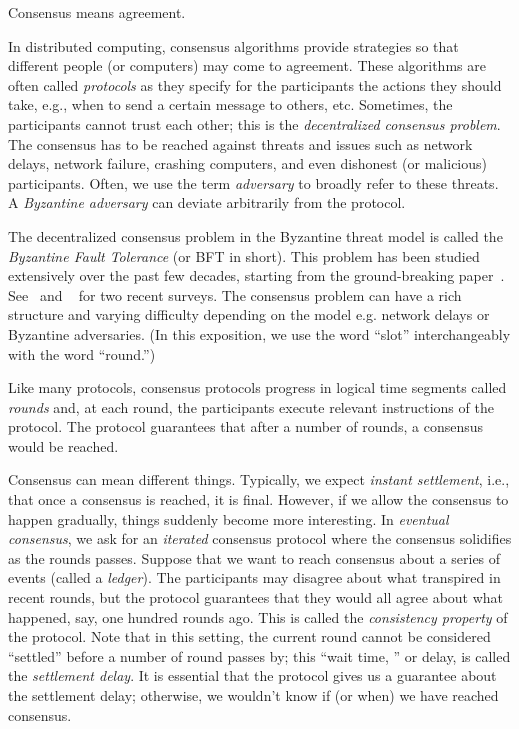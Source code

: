 




Consensus means agreement.

In distributed computing, 
consensus algorithms provide strategies 
so that different people (or computers) 
may come to agreement. 
These algorithms are often called \emph{protocols} as they 
specify for the participants 
the actions they should take, 
e.g., when to send a certain message to others, etc. 
Sometimes, the participants cannot trust each other; 
this is the \emph{decentralized consensus problem}. 
The consensus has to be reached against threats and issues such as 
network delays, network failure, crashing computers, and even 
dishonest (or malicious) participants. 
Often, we use the term \emph{adversary} to broadly refer to these threats. 
A \emph{Byzantine adversary} can deviate arbitrarily from the protocol. 


The decentralized consensus problem in the Byzantine threat model 
is called the \emph{Byzantine Fault Tolerance} (or BFT in short). 
This problem has been studied extensively over the past few decades, 
starting from the ground-breaking paper~\citet{BFT}. 
See~\citet{GK} and ~\citet{ConsensusBlockchains} for two recent surveys.
The consensus problem can have a rich structure and varying difficulty 
depending on the model e.g. network delays or Byzantine adversaries. 
(In this exposition, 
we use the word ``slot'' interchangeably with the word ``round.'')

Like many protocols, consensus protocols 
progress in logical time segments called \emph{rounds} 
and, at each round, the participants execute relevant instructions of the protocol. 
The protocol guarantees that after a number of rounds, 
a consensus would be reached. 

Consensus can mean different things. 
Typically, we expect \emph{instant settlement}, 
i.e., that once a consensus is reached, 
it is final. 
However, if we allow the consensus to happen gradually, 
things suddenly become more interesting.
In \emph{eventual consensus}, 
we ask for an \emph{iterated} consensus protocol 
where the consensus solidifies as the rounds passes. 
Suppose that we want to reach consensus about a series of events 
(called a \emph{ledger}). 
The participants may disagree about what transpired in recent rounds, 
but the protocol guarantees that they would all agree about 
what happened, say, one hundred rounds ago. 
This is called the \emph{consistency property} of the protocol. 
Note that in this setting, 
the current round cannot be considered ``settled'' 
before a number of round passes by; 
this ``wait time, '' or delay, is called the \emph{settlement delay}. 
It is essential that the protocol gives us a guarantee 
about the settlement delay;
otherwise, we wouldn't know if (or when) we have reached consensus.

